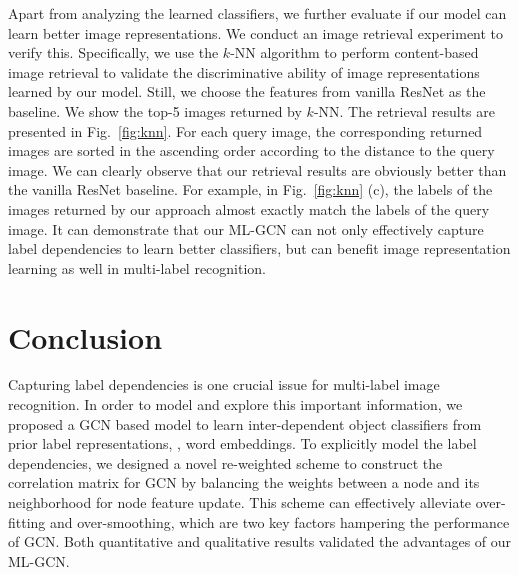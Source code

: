 \documentclass[10pt,twocolumn,letterpaper]{article}
\begin{document}
Apart from analyzing the learned classifiers, we further evaluate if our model can learn better image representations. We conduct an image retrieval experiment to verify this. Specifically, we use the $k$-NN algorithm to perform content-based image retrieval to validate the discriminative ability of image representations learned by our model. Still, we choose the features from vanilla ResNet as the baseline. We show the top-5 images returned by $k$-NN. The retrieval results are presented in Fig.~\ref{fig:knn}. For each query image, the corresponding returned images are sorted in the ascending order according to the distance to the query image. We can clearly observe that our retrieval results are obviously better than the vanilla ResNet baseline. For example,  in Fig.~\ref{fig:knn} (c), the labels of the images returned by our approach almost exactly match the labels of the query image. It can demonstrate that our ML-GCN can not only effectively capture label dependencies to learn better classifiers, but can benefit image representation learning as well in multi-label recognition.

\section{Conclusion}

Capturing label dependencies is one crucial issue for multi-label image recognition. In order to model and explore this important information, we proposed a GCN based model to learn inter-dependent object classifiers from prior label representations, \eg, word embeddings. To explicitly model the label dependencies, we designed a novel re-weighted scheme to construct the correlation matrix for GCN by balancing the weights between a node and its neighborhood for node feature update. This scheme can effectively alleviate over-fitting and over-smoothing, which are two key factors hampering the performance of GCN. Both quantitative and qualitative results validated the advantages of our ML-GCN.




{\small


}
\end{document}
